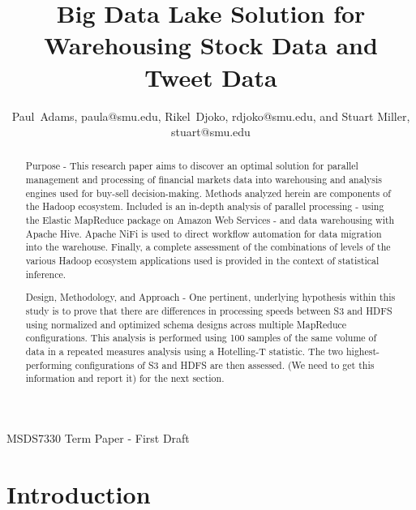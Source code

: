 \documentclass[journal]{IEEEtran}
\begin{document}
\title{Big Data Lake Solution for\\ 
	Warehousing Stock Data and Tweet Data}

\author{Paul~Adams, paula@smu.edu,
        Rikel~Djoko, rdjoko@smu.edu,
        and Stuart Miller, stuart@smu.edu}%

{MSDS7330 Term Paper - First Draft}

\maketitle

\begin{abstract}

Purpose - This research paper aims to discover an optimal solution for parallel management and processing of financial markets data into  warehousing and analysis engines used for buy-sell decision-making. Methods analyzed herein are components of the Hadoop ecosystem. Included is an in-depth analysis of parallel processing - using the Elastic MapReduce package on Amazon Web Services - and data warehousing with Apache Hive. Apache NiFi is used to direct workflow automation for data migration into the warehouse. Finally, a complete assessment of the combinations of levels of the various Hadoop ecosystem applications used is provided in the context of statistical inference.

Design, Methodology, and Approach - One pertinent, underlying hypothesis within this study is to prove that there are differences in processing speeds between S3 and HDFS using normalized and optimized schema designs across multiple MapReduce configurations. This analysis is performed using 100 samples of the same volume of data in a repeated measures analysis using a Hotelling-T statistic. The two highest-performing configurations of S3 and HDFS are then assessed. (We need to get this information and report it) for the next section.

\end{abstract}

\section{Introduction}
\end{document}
